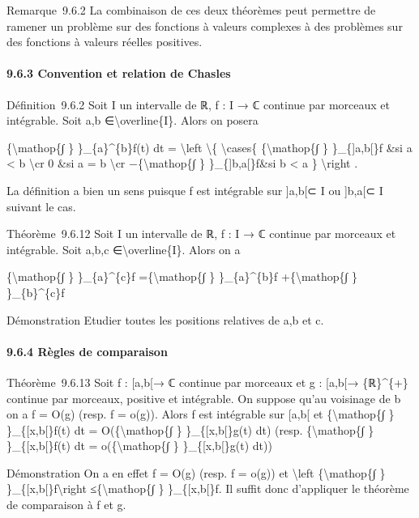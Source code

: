 \documentclass[]{article}
\begin{document}
Remarque~9.6.2 La combinaison de ces deux théorèmes peut permettre de
ramener un problème sur des fonctions à valeurs complexes à des
problèmes sur des fonctions à valeurs réelles positives.

\paragraph{9.6.3 Convention et relation de Chasles}

Définition~9.6.2 Soit I un intervalle de ℝ, f : I → ℂ continue par
morceaux et intégrable. Soit a,b ∈\textbackslash{}overline\{I\}. Alors
on posera

\{\textbackslash{}mathop\{∫ \} \}\_\{a\}\^{}\{b\}f(t) dt =
\textbackslash{}left \textbackslash{}\{ \textbackslash{}cases\{
\{\textbackslash{}mathop\{∫ \} \}\_\{{]}a,b{[}\}f \&si a \textless{} b
\textbackslash{}cr 0 \&si a = b \textbackslash{}cr
−\{\textbackslash{}mathop\{∫ \} \}\_\{{]}b,a{[}\}f\&si b \textless{} a
\} \textbackslash{}right .

La définition a bien un sens puisque f est intégrable sur {]}a,b{[}⊂ I
ou {]}b,a{[}⊂ I suivant le cas.

Théorème~9.6.12 Soit I un intervalle de ℝ, f : I → ℂ continue par
morceaux et intégrable. Soit a,b,c ∈\textbackslash{}overline\{I\}. Alors
on a

\{\textbackslash{}mathop\{∫ \} \}\_\{a\}\^{}\{c\}f
=\{\textbackslash{}mathop\{∫ \} \}\_\{a\}\^{}\{b\}f
+\{\textbackslash{}mathop\{∫ \} \}\_\{b\}\^{}\{c\}f

Démonstration Etudier toutes les positions relatives de a,b et c.

\paragraph{9.6.4 Règles de comparaison}

Théorème~9.6.13 Soit f : {[}a,b{[}→ ℂ continue par morceaux et g :
{[}a,b{[}→ \{ℝ\}\^{}\{+\} continue par morceaux, positive et intégrable.
On suppose qu'au voisinage de b on a f = O(g) (resp. f = o(g)). Alors f
est intégrable sur {[}a,b{[} et \{\textbackslash{}mathop\{∫ \}
\}\_\{{[}x,b{[}\}f(t) dt = O(\{\textbackslash{}mathop\{∫ \}
\}\_\{{[}x,b{[}\}g(t) dt) (resp. \{\textbackslash{}mathop\{∫ \}
\}\_\{{[}x,b{[}\}f(t) dt = o(\{\textbackslash{}mathop\{∫ \}
\}\_\{{[}x,b{[}\}g(t) dt))

Démonstration On a en effet \textbar{}f\textbar{} = O(g) (resp.
\textbar{}f\textbar{} = o(g)) et \textbackslash{}left
\textbar{}\{\textbackslash{}mathop\{∫ \}
\}\_\{{[}x,b{[}\}f\textbackslash{}right
\textbar{}≤\{\textbackslash{}mathop\{∫ \}
\}\_\{{[}x,b{[}\}\textbar{}f\textbar{}. Il suffit donc d'appliquer le
théorème de comparaison à \textbar{}f\textbar{} et g.
\end{document}
